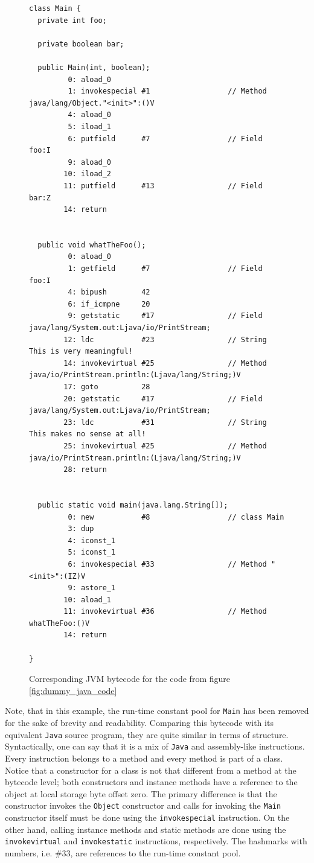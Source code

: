\begin{figure}[H]
\centering 
\begin{lstlisting}
class Main {
  private int foo;

  private boolean bar;

  public Main(int, boolean);
         0: aload_0
         1: invokespecial #1                  // Method java/lang/Object."<init>":()V
         4: aload_0
         5: iload_1
         6: putfield      #7                  // Field foo:I
         9: aload_0
        10: iload_2
        11: putfield      #13                 // Field bar:Z
        14: return


  public void whatTheFoo();
         0: aload_0
         1: getfield      #7                  // Field foo:I
         4: bipush        42
         6: if_icmpne     20
         9: getstatic     #17                 // Field java/lang/System.out:Ljava/io/PrintStream;
        12: ldc           #23                 // String This is very meaningful!
        14: invokevirtual #25                 // Method java/io/PrintStream.println:(Ljava/lang/String;)V
        17: goto          28
        20: getstatic     #17                 // Field java/lang/System.out:Ljava/io/PrintStream;
        23: ldc           #31                 // String This makes no sense at all!
        25: invokevirtual #25                 // Method java/io/PrintStream.println:(Ljava/lang/String;)V
        28: return


  public static void main(java.lang.String[]);
         0: new           #8                  // class Main
         3: dup
         4: iconst_1
         5: iconst_1
         6: invokespecial #33                 // Method "<init>":(IZ)V
         9: astore_1
        10: aload_1
        11: invokevirtual #36                 // Method whatTheFoo:()V
        14: return

}
\end{lstlisting}
\caption{Corresponding JVM bytecode for the code from figure \ref{fig:dummy_java_code}}
\label{fig:dummy_bytecode}
\end{figure}

Note, that in this example, the run-time constant pool for \texttt{Main} has been removed for the sake of brevity and readability.
Comparing this bytecode with its equivalent \texttt{Java} source program, they are quite similar in terms of structure.
Syntactically, one can say that it is a mix of \texttt{Java} and assembly-like instructions. Every instruction belongs to a
method and every method is part of a class. Notice that a constructor for a class is not that different from a method at
the bytecode level; both constructors and instance methods have a reference to the object at local storage byte offset zero.
The primary difference is that the constructor invokes the \texttt{Object}\cite{java_object} constructor and calls
for invoking the \texttt{Main} constructor itself must be done using the \texttt{invokespecial}\cite{jvm_spec} instruction. On the other
hand, calling instance methods and static methods are done using the \texttt{invokevirtual} and \texttt{invokestatic} instructions,
respectively. The hashmarks with numbers, i.e. \#33, are references to the run-time constant pool.

